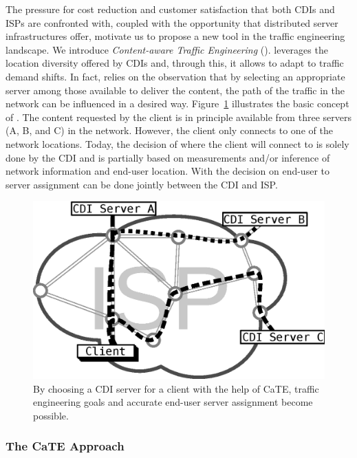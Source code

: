 The pressure for cost reduction and customer satisfaction that both CDIs and
ISPs are confronted with, coupled with the opportunity that distributed server
infrastructures offer, motivate us to propose a new tool in the traffic
engineering landscape. We introduce \emph{Content-aware Traffic Engineering}
(\cate). \cate leverages the location diversity offered by CDIs and, through
this, it allows to adapt to traffic demand shifts. In fact, \cate relies on the
observation that by selecting an appropriate server among those available to
deliver the content, the path of the traffic in the network can be influenced
in a desired way. Figure~\ref{fig:flowSelection} illustrates the basic concept
of \cate. The content requested by the client is in principle available from
three servers (A, B, and C) in the network. However, the client only connects
to one of the network locations. Today, the decision of where the client will
connect to is solely done by the CDI and is partially based on measurements
and/or inference of network information and end-user location. With \cate the
decision on end-user to server assignment can be done jointly between the CDI
and ISP.

\begin{figure}[tbp]
  \center\includegraphics[width=0.8\linewidth]{figures/trafficShift-concept.eps}
  \caption{By choosing a CDI server for a client with the help of CaTE, traffic
  engineering goals and accurate end-user server assignment become possible.}
  \label{fig:flowSelection}
  \vspace{-1.5em}
\end{figure}


\subsubsection{The CaTE Approach}\label{sec:cate}

